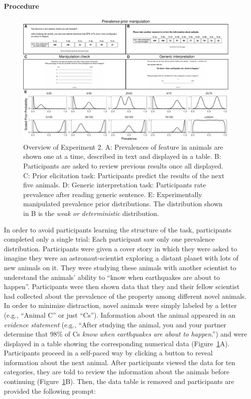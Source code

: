 \documentclass[floatsintext,doc]{apa6}
\let\oldparagraph\paragraph
\renewcommand{\paragraph}[1]{\oldparagraph{#1}\mbox{}}
\begin{document}
\hypertarget{procedure}{%
\paragraph{Procedure}\label{procedure}}

\begin{figure}
\centering
\includegraphics{genint_files/figure-latex/priorManipulationExpt-1.pdf}
\caption{\label{fig:priorManipulationExpt}Overview of Experiment 2. A: Prevalences of feature in animals are shown one at a time, described in text and displayed in a table. B: Participants are asked to review previous results once all displayed. C: Prior elicitation task: Participants predict the results of the next five animals. D: Generic interpretation task: Participants rate prevalence after reading generic sentence. E: Experimentally manipulated prevalence prior distributions. The distribution shown in B is the \emph{weak or deterministic} distribution.}
\end{figure}

In order to avoid participants learning the structure of the task, participants completed only a single trial: Each participant saw only one prevalence distribution.
Participants were given a cover story in which they were asked to imagine they were an astronaut-scientist exploring a distant planet with lots of new animals on it.
They were studying these animals with another scientist to understand the animals' ability to \enquote{know when earthquakes are about to happen}.
Participants were then shown data that they and their fellow scientist had collected about the prevalence of the property among different novel animals.
In order to minimize distraction, novel animals were simply labeled by a letter (e.g., \enquote{Animal C} or just \enquote{Cs}).
Information about the animal appeared in an \emph{evidence statement} (e.g., \enquote{After studying the animal, you and your partner determine that 98\% of Cs \emph{know when earthquakes are about to happen}.}) and were displayed in a table showing the corresponding numerical data (Figure~\ref{fig:priorManipulationExpt}A).
Participants proceed in a self-paced way by clicking a button to reveal information about the next animal.
After participants viewed the data for ten categories, they are told to review the information about the animals before continuing (Figure~\ref{fig:priorManipulationExpt}B).
Then, the data table is removed and participants are provided the following prompt:
\end{document}
